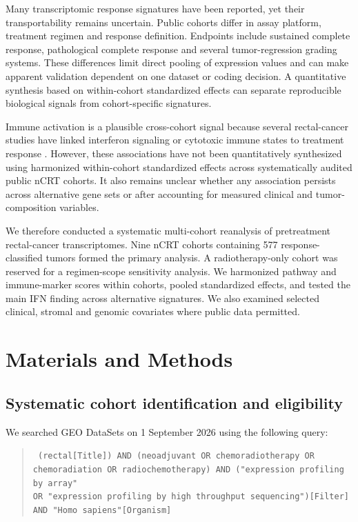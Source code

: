 \documentclass[11pt,a4paper]{article}
\begin{document}
Many transcriptomic response signatures have been reported, yet their transportability remains uncertain. Public cohorts differ in assay platform, treatment regimen and response definition. Endpoints include sustained complete response, pathological complete response and several tumor-regression grading systems. These differences limit direct pooling of expression values and can make apparent validation dependent on one dataset or coding decision. A quantitative synthesis based on within-cohort standardized effects can separate reproducible biological signals from cohort-specific signatures.

Immune activation is a plausible cross-cohort signal because several rectal-cancer studies have linked interferon signaling or cytotoxic immune states to treatment response \cite{Akiyoshi,Chatila,Alderdice}. However, these associations have not been quantitatively synthesized using harmonized within-cohort standardized effects across systematically audited public nCRT cohorts. It also remains unclear whether any association persists across alternative gene sets or after accounting for measured clinical and tumor-composition variables.

We therefore conducted a systematic multi-cohort reanalysis of pretreatment rectal-cancer transcriptomes. Nine nCRT cohorts containing 577 response-classified tumors formed the primary analysis. A radiotherapy-only cohort was reserved for a regimen-scope sensitivity analysis. We harmonized pathway and immune-marker scores within cohorts, pooled standardized effects, and tested the main IFN finding across alternative signatures. We also examined selected clinical, stromal and genomic covariates where public data permitted.

\section{Materials and Methods}

\subsection{Systematic cohort identification and eligibility}

We searched GEO DataSets on 1 September 2026 using the following query:
\begin{quote}\small\texttt{%
(rectal[Title]) AND (neoadjuvant OR chemoradiotherapy OR \\
chemoradiation OR radiochemotherapy) AND ("expression profiling by array" \\
OR "expression profiling by high throughput sequencing")[Filter] \\
AND "Homo sapiens"[Organism]}\end{quote}
\end{document}
